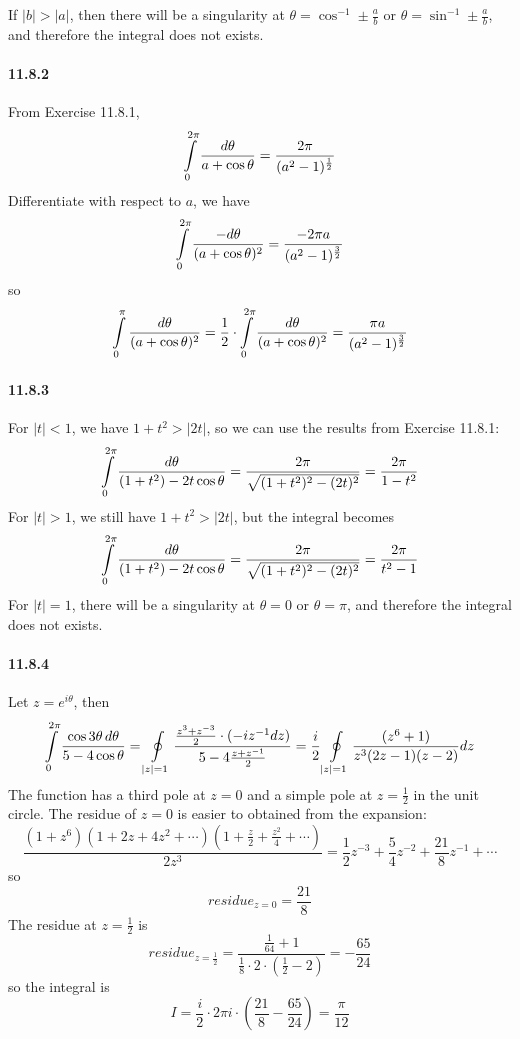 \documentclass[a4paper]{article}
\begin{document}
If $|b|>|a|$, then there will be a singularity at $\theta=\cos^{-1}\pm\frac{a}{b}$ or $\theta=\sin^{-1}\pm\frac{a}{b}$, and therefore the integral does not exists.

\paragraph{11.8.2}
From Exercise 11.8.1, 
\[
\int\displaylimits_0^{2\pi}\frac{d\theta}{a+\cos\theta}=\frac{2\pi}{(a^2-1)^{\frac{1}{2}}}
\]
Differentiate with respect to $a$, we have
\[
\int\displaylimits_0^{2\pi}\frac{-d\theta}{(a+\cos\theta)^2}=\frac{-2\pi a}{(a^2-1)^{\frac{3}{2}}}
\]
so
\[
\int\displaylimits_0^{\pi}\frac{d\theta}{(a+\cos\theta)^2}=\frac{1}{2}\cdot\int\displaylimits_0^{2\pi}\frac{d\theta}{(a+\cos\theta)^2}=\frac{\pi a}{(a^2-1)^{\frac{3}{2}}}
\]

\paragraph{11.8.3}
For $|t|<1$, we have $1+t^2>|2t|$, so we can use the results from Exercise 11.8.1:
\[
\int\displaylimits_0^{2\pi}\frac{d\theta}{(1+t^2)-2t\cos\theta}=\frac{2\pi}{\sqrt{(1+t^2)^2-(2t)^2}}=\frac{2\pi}{1-t^2}
\]
For $|t|>1$, we still have $1+t^2>|2t|$, but the integral becomes
\[
\int\displaylimits_0^{2\pi}\frac{d\theta}{(1+t^2)-2t\cos\theta}=\frac{2\pi}{\sqrt{(1+t^2)^2-(2t)^2}}=\frac{2\pi}{t^2-1}
\]
For $|t|=1$, there will be a singularity at $\theta=0$ or $\theta=\pi$, and therefore the integral does not exists.

\paragraph{11.8.4}
Let $z=e^{i\theta}$, then
\[
\int\displaylimits_0^{2\pi}\frac{\cos3\theta\,d\theta}{5-4\cos\theta}=\oint\displaylimits_{|z|=1}\frac{\frac{z^3+z^{-3}}{2}\cdot(-iz^{-1}dz)}{5-4\frac{z+z^{-1}}{2}}=\frac{i}{2}\oint\displaylimits_{|z|=1}\frac{(z^6+1)}{z^3(2z-1)(z-2)}dz
\]
The function has a third pole at $z=0$ and a simple pole at $z=\frac{1}{2}$ in the unit circle. The residue of $z=0$ is easier to obtained from the expansion:
\[
\frac{(1+z^6)(1+2z+4z^2+\cdots)(1+\frac{z}{2}+\frac{z^2}{4}+\cdots)}{2z^3}=\frac{1}{2}z^{-3}+\frac{5}{4}z^{-2}+\frac{21}{8}z^{-1}+\cdots
\]
so
\[
residue_{z=0}=\frac{21}{8}
\]
The residue at $z=\frac{1}{2}$ is
\[
residue_{z=\frac{1}{2}}=\frac{\frac{1}{64}+1}{\frac{1}{8}\cdot2\cdot(\frac{1}{2}-2)}=-\frac{65}{24}
\]
so the integral is
\[
I=\frac{i}{2}\cdot2\pi i\cdot(\frac{21}{8}-\frac{65}{24})=\frac{\pi}{12}
\]
\end{document}
